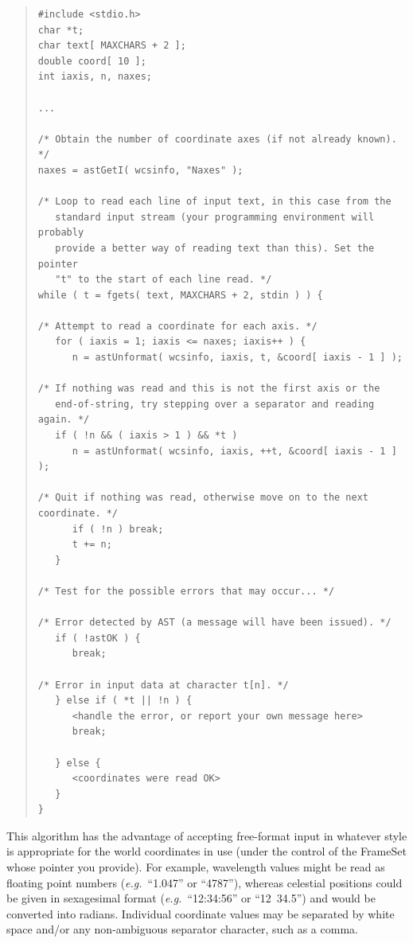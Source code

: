 \documentclass[twoside,11pt]{article}
\begin{document}
\begin{quote}
\small
\begin{verbatim}
#include <stdio.h>
char *t;
char text[ MAXCHARS + 2 ];
double coord[ 10 ];
int iaxis, n, naxes;

...

/* Obtain the number of coordinate axes (if not already known). */
naxes = astGetI( wcsinfo, "Naxes" );

/* Loop to read each line of input text, in this case from the
   standard input stream (your programming environment will probably
   provide a better way of reading text than this). Set the pointer
   "t" to the start of each line read. */
while ( t = fgets( text, MAXCHARS + 2, stdin ) ) {

/* Attempt to read a coordinate for each axis. */
   for ( iaxis = 1; iaxis <= naxes; iaxis++ ) {
      n = astUnformat( wcsinfo, iaxis, t, &coord[ iaxis - 1 ] );

/* If nothing was read and this is not the first axis or the
   end-of-string, try stepping over a separator and reading again. */
   if ( !n && ( iaxis > 1 ) && *t )
      n = astUnformat( wcsinfo, iaxis, ++t, &coord[ iaxis - 1 ] );

/* Quit if nothing was read, otherwise move on to the next coordinate. */
      if ( !n ) break;
      t += n;
   }

/* Test for the possible errors that may occur... */

/* Error detected by AST (a message will have been issued). */
   if ( !astOK ) {
      break;

/* Error in input data at character t[n]. */
   } else if ( *t || !n ) {
      <handle the error, or report your own message here>
      break;

   } else {
      <coordinates were read OK>
   }
}
\end{verbatim}
\normalsize
\end{quote}

This algorithm has the advantage of accepting free-format input in
whatever style is appropriate for the world coordinates in use (under
the control of the FrameSet whose pointer you provide). For example,
wavelength values might be read as floating point numbers
({\em{e.g.}}\ ``1.047'' or ``4787''), whereas celestial positions
could be given in sexagesimal format ({\em{e.g.}}\ ``12:34:56'' or
``12~34.5'') and would be converted into radians. Individual
coordinate values may be separated by white space and/or any
non-ambiguous separator character, such as a comma.
\end{document}
